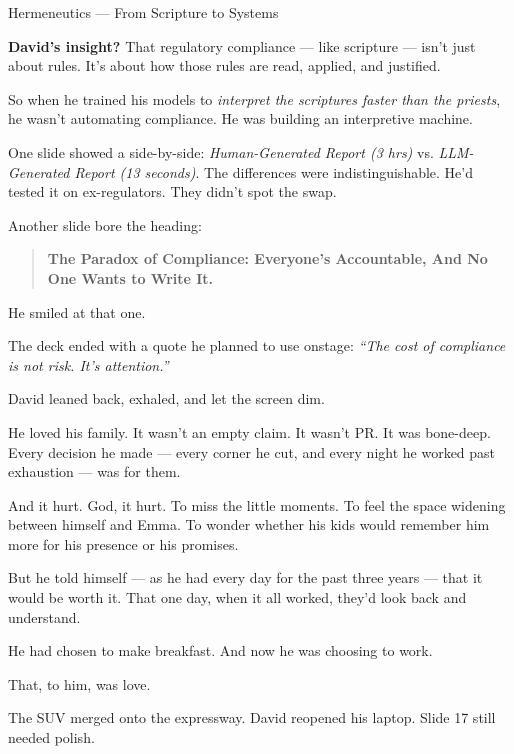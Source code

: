 \begin{PhilosophicalSidebar}{Hermeneutics --- From Scripture to Systems}
    \medskip
    
    \textbf{David’s insight?}  
    That regulatory compliance --- like scripture --- isn’t just about rules.  
    It’s about how those rules are read, applied, and justified.
    
    \medskip
    
    So when he trained his models to \textit{interpret the scriptures faster than the priests},  
    he wasn’t automating compliance.  
    He was building an interpretive machine.
    
\end{PhilosophicalSidebar}

\medskip


One slide showed a side-by-side:
\textit{Human-Generated Report (3 hrs)} vs. \textit{LLM-Generated Report (13 seconds)}.
The differences were indistinguishable. He’d tested it on ex-regulators. They didn’t spot the swap.

Another slide bore the heading:

\begin{quote}
    \centering
    \textbf{The Paradox of Compliance: Everyone’s Accountable, And No One Wants to Write It.}
\end{quote}

He smiled at that one.

The deck ended with a quote he planned to use onstage:
\textit{“The cost of compliance is not risk. It’s attention.”}

David leaned back, exhaled, and let the screen dim.

He loved his family.
It wasn’t an empty claim. It wasn’t PR. It was bone-deep.
Every decision he made — every corner he cut, and every night he worked past exhaustion — was for them.

And it hurt. God, it hurt.
To miss the little moments. To feel the space widening between himself and Emma.
To wonder whether his kids would remember him more for his presence or his promises.

But he told himself --- as he had every day for the past three years --- that it would be worth it.
That one day, when it all worked, they’d look back and understand.

He had chosen to make breakfast.
And now he was choosing to work.

That, to him, was love.

The SUV merged onto the expressway.
David reopened his laptop.
Slide 17 still needed polish.

